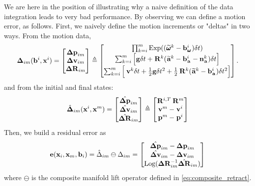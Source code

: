 We are here in the position of illustrating why a naive definition of the data integration leads to very bad performance. 
By observing  we can define a motion error, as follows. 
First, we naively define the motion increments or "deltas"
%
%
in two ways. 
From the motion data, %
%
\begin{align}
    {\bm \Delta}_{im}({\bf b}^i, {\bf x}^i) = 
    \begin{bmatrix}
    {\bm \Delta {\bf p}}_{im}\\ {\bm \Delta {\bf v}}_{im}\\ {\bm \Delta {\bf R}}_{im}
    \end{bmatrix} \triangleq
    \begin{bmatrix}
    \prod_{k=i}^{m} \operatorname*{Exp}((\prescript{}{}{\widetilde{\pmb{\omega}}}_{}^k - {\bf b}_{\prescript{}{}{\pmb{\omega}}_{}}^i)\delta t)  \\
    \sum_{k=i}^{m} \Big[{\bf g} \delta t + \prescript{}{}{{\bf R}}_{}^{k}(\prescript{}{}{\widetilde{{\bf a}}}_{}^k - {\bf b}_{\prescript{}{}{{\bf a}}_{}}^i - {\bf n}_{\prescript{}{}{{\bf a}}_{}}^k)\delta t \Big]  \\
    \sum_{k=i}^{m} \Big[\prescript{}{}{{\bf v}}_{}^{k}\delta t + \frac{1}{2}{\bf g} \delta t^2 
    + \frac{1}{2}\prescript{}{}{{\bf R}}_{}^{k}(\prescript{}{}{\widetilde{{\bf a}}}_{}^k - {\bf b}_{\prescript{}{}{{\bf a}}_{}}^i)\delta t^2 \Big]
    \end{bmatrix}.
    \label{eq:imu_delta_naive}
\end{align}
%
and from the initial and final states:
%
\begin{align}
    \hat{{\bm \Delta}}_{im}({\bf x}^i, {\bf x}^m) = 
    \begin{bmatrix}
    \hat{{\bm \Delta {\bf p}}}_{im}\\ \hat{{\bm \Delta {\bf v}}}_{im}\\ \hat{{\bm \Delta {\bf R}}}_{im}
    \end{bmatrix} \triangleq
    \begin{bmatrix}
    \prescript{}{}{{\bf R}}_{}^{i,T} \prescript{}{}{{\bf R}}_{}^{m}  \\
    \prescript{}{}{{\bf v}}_{}^{m}  - \prescript{}{}{{\bf v}}_{}^{i}  \\
    \prescript{}{}{{\bf p}}_{}^{m} - \prescript{}{}{{\bf p}}_{}^{i}
    \end{bmatrix}
\end{align}
%
Then, we build a residual error as
%
\begin{equation}
    {\bf e}({\bf x}_i, {\bf x}_m, {\bf b}_i) = \hat\Delta_{im} \ominus \Delta_{im} =
    \begin{bmatrix}
    \hat{{\bm \Delta {\bf p}}}_{im} - {\bm \Delta {\bf p}}_{im} \\ 
    \hat{{\bm \Delta {\bf v}}}_{im} - {\bm \Delta {\bf v}}_{im} \\ 
    \operatorname*{Log}({\bm \Delta {\bf R}}_{im}^{-1} \hat{{\bm \Delta {\bf R}}}_{im}) 
    \end{bmatrix}
    \label{eq:error_naive_preintegration}
\end{equation}
%
where $\ominus$ is the composite manifold lift operator defined in \ref{eq:composite_retract}.

